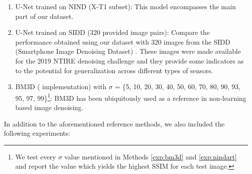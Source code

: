 \begin{enumerate}
\itemsep0em 
  \item\label{exp:nindxt1} U-Net trained on \ac{NIND} (X-T1 subset):\newline
  This model encompasses the main part of our dataset.
  \item\label{exp:sidd} U-Net trained on \ac{SIDD} (320 provided image pairs):\newline
  Compare the performance obtained using our dataset with 320 images from the \ac{SIDD} (Smartphone Image Denoising Dataset) \cite{sidd}. These images were made available for the 2019 NTIRE denoising challenge and they provide some indicators as to the potential for generalization across different types of sensors.
  \item\label{exp:bm3d} \ac{BM3D} \cite{bm3d} ( \cite{bm3d-gpu} implementation) with $\sigma$ = \{5, 10, 20, 30, 40, 50, 60, 70, 80, 90, 93, 95, 97, 99\}\footnote{\label{sigmanote}We test every $\sigma$ value mentioned in Methods \ref{exp:bm3d} and \ref{exp:nindart} and report the value which yields the highest \ac{SSIM} for each test image.}:\newline
  BM3D has been ubiquitously used as a reference in non-learning based image denoising.
\end{enumerate}
In addition to the aforementioned reference methods, we also included the following experiments:

